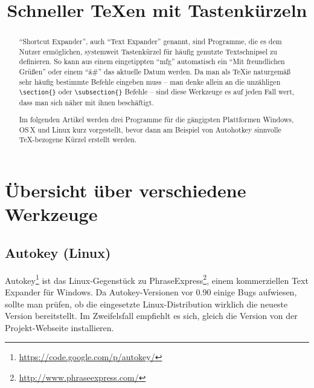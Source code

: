 \documentclass[ngerman]{dtk}%
\begin{document}
\title{Schneller \TeX en mit Tastenkürzeln}


\maketitle


\begin{abstract}
\enquote{Shortcut Expander}, auch  \enquote{Text Expander} genannt, sind Programme, die es dem Nutzer ermöglichen, systemweit Tastenkürzel für häufig genutzte Textschnipsel zu definieren. So kann aus einem eingetippten \enquote{mfg} automatisch ein \enquote{Mit freundlichen Grüßen} oder einem \enquote{ä\#} das aktuelle Datum werden. Da man als \TeX ie naturgemäß sehr häufig bestimmte Befehle eingeben muss -- man denke allein an die unzähligen \verb|\section{}| oder \verb|\subsection{}| Befehle -- sind diese Werkzeuge es auf jeden Fall wert, dass man sich näher mit ihnen beschäftigt. 

Im folgenden Artikel werden drei Programme für die gängigsten Plattformen Windows, OS\,X und Linux kurz vorgestellt, bevor dann am Beispiel von Autohotkey sinnvolle \TeX-bezogene Kürzel erstellt werden.
\end{abstract}

\section{Übersicht über verschiedene Werkzeuge}
\subsection{Autokey (Linux)}

Autokey\footnote{\url{https://code.google.com/p/autokey/}} ist das Linux-Gegenstück zu PhraseExpress\footnote{\url{http://www.phraseexpress.com/}}, einem kommerziellen Text Expander für Windows. Da Autokey-Versionen vor 0.90 einige Bugs aufwiesen, sollte man prüfen, ob die eingesetzte Linux-Distribution wirklich die neueste Version bereitstellt. Im Zweifelsfall empfiehlt es sich, gleich die Version von der Projekt-Webseite installieren.
\end{document}
